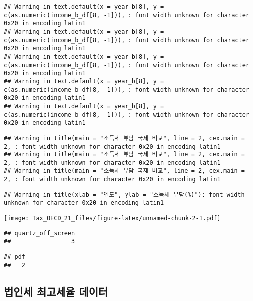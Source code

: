 \documentclass[
]{article}
\begin{document}
\begin{verbatim}
## Warning in text.default(x = year_b[8], y = c(as.numeric(income_b_df[8, -1])), : font width unknown for character 0x20 in encoding latin1
## Warning in text.default(x = year_b[8], y = c(as.numeric(income_b_df[8, -1])), : font width unknown for character 0x20 in encoding latin1
## Warning in text.default(x = year_b[8], y = c(as.numeric(income_b_df[8, -1])), : font width unknown for character 0x20 in encoding latin1
## Warning in text.default(x = year_b[8], y = c(as.numeric(income_b_df[8, -1])), : font width unknown for character 0x20 in encoding latin1
## Warning in text.default(x = year_b[8], y = c(as.numeric(income_b_df[8, -1])), : font width unknown for character 0x20 in encoding latin1
\end{verbatim}

\begin{verbatim}
## Warning in title(main = "소득세 부담 국제 비교", line = 2, cex.main = 2, : font width unknown for character 0x20 in encoding latin1
## Warning in title(main = "소득세 부담 국제 비교", line = 2, cex.main = 2, : font width unknown for character 0x20 in encoding latin1
## Warning in title(main = "소득세 부담 국제 비교", line = 2, cex.main = 2, : font width unknown for character 0x20 in encoding latin1
\end{verbatim}

\begin{verbatim}
## Warning in title(xlab = "연도", ylab = "소득세 부담(%)"): font width unknown for character 0x20 in encoding latin1
\end{verbatim}

\texttt{[image: Tax\_OECD\_21\_files/figure-latex/unnamed-chunk-2-1.pdf]}

\begin{verbatim}
## quartz_off_screen 
##                 3
\end{verbatim}

\begin{verbatim}
## pdf 
##   2
\end{verbatim}

\subsection{법인세 최고세율
데이터}\label{uxbc95uxc778uxc138-uxcd5cuxace0uxc138uxc728-uxb370uxc774uxd130}
\end{document}
